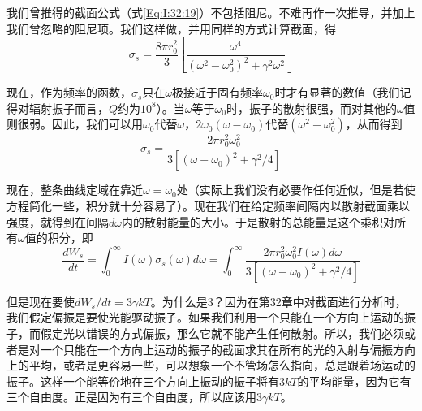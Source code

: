 我们曾推得的截面公式（式\ref{Eq:I:32:19}）不包括阻尼。不难再作一次推导，并加上我们曾忽略的阻尼项。我们这样做，并用同样的方式计算截面，得
\begin{equation}
    \label{Eq:I:41:8}
    \sigma_s = \frac{8\pi r_0^2}{3} \left [ \frac{\omega^4}{(\omega^2 - \omega_0^2)^2 + \gamma^2\omega^2} \right ]
\end{equation}

现在，作为频率的函数，$\sigma_s$只在$\omega$极接近于固有频率$\omega_0$时才有显著的数值（我们记得对辐射振子而言，$Q$约为$10^8$）。当$\omega$等于$\omega_0$时，振子的散射很强，而对其他的$\omega$值则很弱。因此，我们可以用$\omega_0$代替$\omega$，$2\omega_0(\omega-\omega_0)$代替$(\omega^2 - \omega_0^2)$，从而得到
\begin{equation}
    \label{Eq:I:41:9}
    \sigma_s = \frac{2\pi r_0^2\omega_0^2}{3[(\omega - \omega_0)^2 + \gamma^2/4]}
\end{equation}

现在，整条曲线定域在靠近$\omega=\omega_0$处（实际上我们没有必要作任何近似，但是若使方程简化一些，积分就十分容易了）。现在我们在给定频率间隔内以散射截面乘以强度，就得到在间隔$d\omega$内的散射能量的大小。于是散射的总能量是这个乘积对所有$\omega$值的积分，即
\begin{equation}
    \label{Eq:I:41:10}
    \frac{dW_s}{dt} = \int_0^{\infty} I(\omega)\sigma_s(\omega)d\omega = \int_0^{\infty} \frac{2\pi r_0^2 \omega_0^2 I(\omega)d\omega}{3[(\omega - \omega_0)^2 + \gamma^2/4]}
\end{equation}

但是现在要使$dW_s/dt=3\gamma kT$。为什么是$3$？因为在第32章中对截面进行分析时，我们假定偏振是要使光能驱动振子。如果我们利用一个只能在一个方向上运动的振子，而假定光以错误的方式偏振，那么它就不能产生任何散射。所以，我们必须或者是对一个只能在一个方向上运动的振子的截面求其在所有的光的入射与偏振方向上的平均，或者是更容易一些，可以想象一个不管场怎么指向，总是跟着场运动的振子。这样一个能等价地在三个方向上振动的振子将有$3kT$的平均能量，因为它有三个自由度。正是因为有三个自由度，所以应该用$3\gamma kT$。

